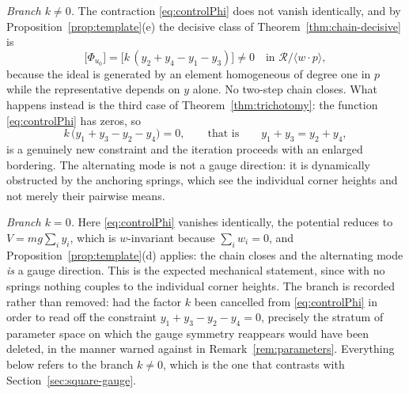 \documentclass[12pt]{article}
\theoremstyle{plain}
\theoremstyle{definition}
\theoremstyle{remark}
\newcommand{\Rring}{\mathcal{R}}
\newcommand{\gen}[1]{\langle #1\rangle}
\begin{document}
	\emph{Branch $k\neq0$.} The contraction \eqref{eq:controlPhi} does not vanish
	identically, and by Proposition~\ref{prop:template}(e) the decisive class of
	Theorem~\ref{thm:chain-decisive} is
	\begin{equation}
		\bigl[\Phi_{u_{0}}\bigr]
		=\bigl[k\,(y_{2}+y_{4}-y_{1}-y_{3})\bigr]\neq0
		\quad\text{in }\Rring/\gen{w\!\cdot\!p},
		\label{eq:controlclass}
	\end{equation}
	because the ideal is generated by an element homogeneous of degree one in $p$
	while the representative depends on $y$ alone. No two-step chain closes. What
	happens instead is the third case of Theorem~\ref{thm:trichotomy}: the function
	\eqref{eq:controlPhi} has zeros, so
	\begin{equation}
		k\,\bigl(y_{1}+y_{3}-y_{2}-y_{4}\bigr)=0,
		\qquad\text{that is}\qquad
		y_{1}+y_{3}=y_{2}+y_{4},
		\label{eq:controlnew}
	\end{equation}
	is a genuinely new constraint and the iteration proceeds with an enlarged
	bordering. The alternating mode is not a gauge direction: it is dynamically
	obstructed by the anchoring springs, which see the individual corner heights and
	not merely their pairwise means.
	
	\emph{Branch $k=0$.} Here \eqref{eq:controlPhi} vanishes identically, the
	potential reduces to $V=mg\sum_{i}y_{i}$, which is $w$-invariant because
	$\sum_{i}w_{i}=0$, and Proposition~\ref{prop:template}(d) applies: the chain
	closes and the alternating mode \emph{is} a gauge direction. This is the
	expected mechanical statement, since with no springs nothing couples to the
	individual corner heights. The branch is recorded rather than removed: had the
	factor $k$ been cancelled from \eqref{eq:controlPhi} in order to read off the
	constraint $y_{1}+y_{3}-y_{2}-y_{4}=0$, precisely the stratum of parameter
	space on which the gauge symmetry reappears would have been deleted, in the
	manner warned against in Remark~\ref{rem:parameters}. Everything below refers
	to the branch $k\neq0$, which is the one that contrasts with
	Section~\ref{sec:square-gauge}.
	
\end{document}
